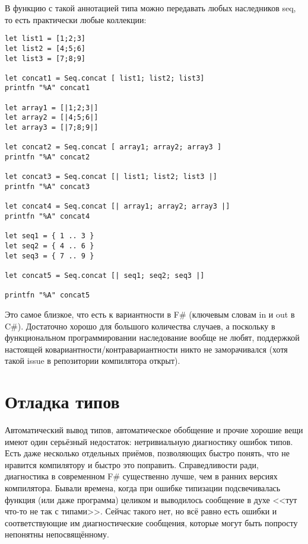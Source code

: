 \documentclass{../../text-style}
\begin{document}
В функцию с такой аннотацией типа можно передавать любых наследников seq, то есть практически любые коллекции:

\begin{verbatim}
let list1 = [1;2;3]
let list2 = [4;5;6]
let list3 = [7;8;9]

let concat1 = Seq.concat [ list1; list2; list3]
printfn "%A" concat1

let array1 = [|1;2;3|]
let array2 = [|4;5;6|]
let array3 = [|7;8;9|]

let concat2 = Seq.concat [ array1; array2; array3 ]
printfn "%A" concat2

let concat3 = Seq.concat [| list1; list2; list3 |]
printfn "%A" concat3

let concat4 = Seq.concat [| array1; array2; array3 |]
printfn "%A" concat4

let seq1 = { 1 .. 3 }
let seq2 = { 4 .. 6 }
let seq3 = { 7 .. 9 }

let concat5 = Seq.concat [| seq1; seq2; seq3 |]

printfn "%A" concat5
\end{verbatim}

Это самое близкое, что есть к вариантности в F\# (ключевым словам in и out в C\#). Достаточно хорошо для большого количества случаев, а поскольку в функциональном программировании наследование вообще не любят, поддержкой настоящей ковариантности/контравариантности никто не заморачивался (хотя такой issue в репозитории компилятора открыт).


\section{Отладка типов}

Автоматический вывод типов, автоматическое обобщение и прочие хорошие вещи имеют один серьёзный недостаток: нетривиальную диагностику ошибок типов. Есть даже несколько отдельных приёмов, позволяющих быстро понять, что не нравится компилятору и быстро это поправить. Справедливости ради, диагностика в современном F\# существенно лучше, чем в ранних версиях компилятора. Бывали времена, когда при ошибке типизации подсвечивалась функция (или даже программа) целиком и выводилось сообщение в духе <<тут что-то не так с типами>>. Сейчас такого нет, но всё равно есть ошибки и соответствующие им диагностические сообщения, которые могут быть попросту непонятны непосвящённому.
\end{document}
